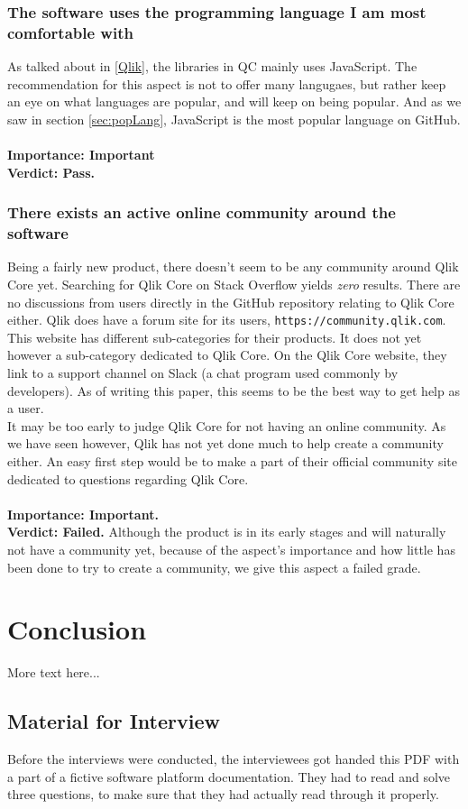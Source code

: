 \documentclass{cslthse-msc}
\begin{document}
    \subsection{The software uses the programming language I am most comfortable with}
    As talked about in \ref{Qlik}, the libraries in QC mainly uses JavaScript. The recommendation for this aspect is not to offer many langugaes, but rather keep an eye on what languages are popular, and will keep on being popular. And as we saw in section \ref{sec:popLang}, JavaScript is the most popular language on GitHub. \\\\
    \textbf{Importance: Important}\\
    \textbf{Verdict: Pass.}
    \subsection{There exists an active online community around the software}
    Being a fairly new product, there doesn't seem to be any community around Qlik Core yet. Searching for Qlik Core on Stack Overflow yields \textit{zero} results. There are no discussions from users directly in the GitHub repository relating to Qlik Core either. Qlik does have a forum site for its users, \texttt{https://community.qlik.com}. This website has different sub-categories for their products. It does not yet however a sub-category dedicated to Qlik Core. On the Qlik Core website, they link to a support channel on Slack (a chat program used commonly by developers). As of writing this paper, this seems to be the best way to get help as a user.\\
    It may be too early to judge Qlik Core for not having an online community. As we have seen however, Qlik has not yet done much to help create a community either. An easy first step would be to make a part of their official community site dedicated to questions regarding Qlik Core.\\ \\
    \textbf{Importance: Important.}\\
    \textbf{Verdict: Failed.} Although the product is in its early stages and will naturally not have a community yet, because of the aspect's importance and how little has been done to try to create a community, we give this aspect a failed grade.
    \chapter{Conclusion}
    More text here...
    \newpage
    
    \begin{appendices}
        \chapter{Material for Interview}\label{interviewMaterial}
        Before the interviews were conducted, the interviewees got handed this PDF with a part of a fictive software platform documentation. They had to read and solve three questions, to make sure that they had actually read through it properly.
        
    \end{appendices}
\end{document}
